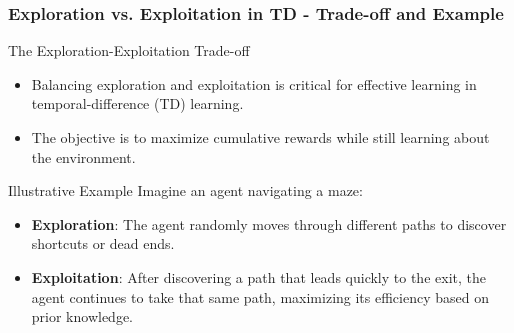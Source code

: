 \documentclass[aspectratio=169]{beamer}
\begin{document}
\begin{frame}[fragile]
    \frametitle{Exploration vs. Exploitation in TD - Trade-off and Example}
    \begin{block}{The Exploration-Exploitation Trade-off}
        \begin{itemize}
            \item Balancing exploration and exploitation is critical for effective learning in temporal-difference (TD) learning.
            \item The objective is to maximize cumulative rewards while still learning about the environment.
        \end{itemize}
    \end{block}

    \begin{block}{Illustrative Example}
        Imagine an agent navigating a maze:
        \begin{itemize}
            \item \textbf{Exploration}: The agent randomly moves through different paths to discover shortcuts or dead ends.
            \item \textbf{Exploitation}: After discovering a path that leads quickly to the exit, the agent continues to take that same path, maximizing its efficiency based on prior knowledge.
        \end{itemize}
    \end{block}
\end{frame}
\end{document}
